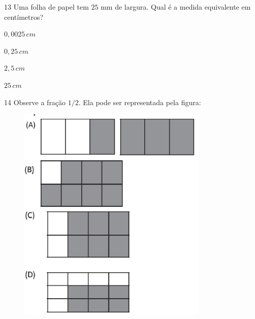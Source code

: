 \num{13} Uma folha de papel tem $25$ mm de largura. Qual é a medida equivalente
em centímetros?

\begin{escolha}
\item $0,0025\,cm$
\item $0,25\,cm$
\item $2,5\,cm$
\item $25\,cm$
\end{escolha}



\pagebreak
\num{14} Observe a fração $1/2$. Ela pode ser representada pela figura:

\begin{figure}[h!]
\includegraphics[width=3.57531in,height=4.10869in]{./imgSAEB_6_MAT/media/image111.png}
\end{figure}

